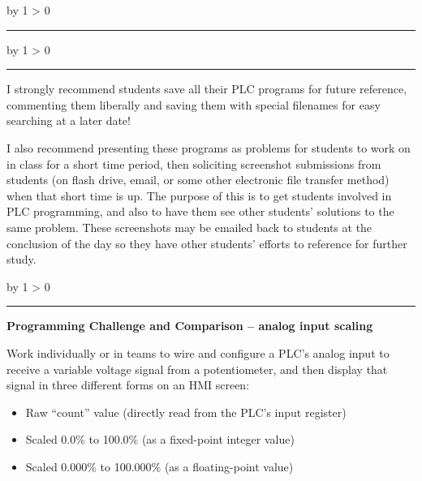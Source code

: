 \documentclass[12pt,a4paper]{article}
\def\oppgave{
            \advance\questnum by 1
            \ifnum \questnum > 0
                 \hrule
                 \vskip 3pt
                 \leftline{Oppgave \the\questnum}
                 \vskip 3pt \fi}
\def\svar{
           \advance\answnum by 1
           \ifnum \answnum > 0
                \hrule
                \vskip 3pt
                \leftline{Svar \the\answnum}
                \vskip 3pt \fi}
\def\notes{
           \advance\explnum by 1
           \ifnum \explnum > 0
                \hrule
                \vskip 3pt
                \leftline{Notes \the\explnum}
                \vskip 3pt \fi}
\begin{document}
\vfil 

\eject
\vskip 10pt \filbreak 





\svar{} 


\vskip 10pt \filbreak 





\notes{} 

I strongly recommend students save all their PLC programs for future reference, commenting them liberally and saving them with special filenames for easy searching at a later date!

\vskip 10pt

I also recommend presenting these programs as problems for students to work on in class for a short time period, then soliciting screenshot submissions from students (on flash drive, email, or some other electronic file transfer method) when that short time is up.  The purpose of this is to get students involved in PLC programming, and also to have them see other students' solutions to the same problem.  These screenshots may be emailed back to students at the conclusion of the day so they have other students' efforts to reference for further study.




\vfil \eject 



\oppgave{} 

\noindent
{\bf Programming Challenge and Comparison -- analog input scaling} 

\vskip 10pt

Work individually or in teams to wire and configure a PLC's analog input to receive a variable voltage signal from a potentiometer, and then display that signal in three different forms on an HMI screen:

\begin{itemize}
\item{} Raw ``count'' value (directly read from the PLC's input register)
\item{} Scaled 0.0\% to 100.0\% (as a fixed-point integer value)
\item{} Scaled 0.000\% to 100.000\% (as a floating-point value)
\end{itemize}
\end{document}
